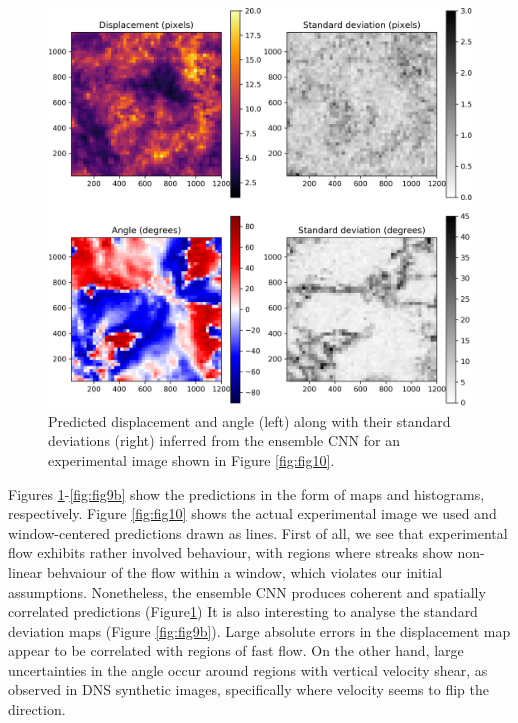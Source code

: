 \documentclass{svjour3}                     %
\begin{document}
\begin{figure}
\includegraphics[width=\textwidth]{figs/figure8a.png}
\caption{Predicted displacement and angle (left) along with their standard deviations (right) inferred from the ensemble CNN for an experimental image shown in Figure \ref{fig:fig10}.}
\label{fig:fig9a}
\end{figure}

Figures \ref{fig:fig9a}-\ref{fig:fig9b} show the predictions in the form of maps and histograms, respectively. Figure \ref{fig:fig10} shows the actual experimental image we used and window-centered predictions drawn as lines. First of all, we see that experimental flow exhibits rather involved behaviour, with regions where streaks show non-linear behvaiour of the flow within a window, which violates our initial assumptions. Nonetheless, the ensemble CNN produces coherent and spatially correlated predictions (Figure\ref{fig:fig9a}) It is also interesting to analyse the standard deviation maps (Figure \ref{fig:fig9b}). Large absolute errors in the displacement map appear to be correlated with regions of fast flow. On the other hand, large uncertainties in the angle occur around regions with vertical velocity shear, as observed in DNS synthetic images, specifically where velocity seems to flip the direction. 
\end{document}
